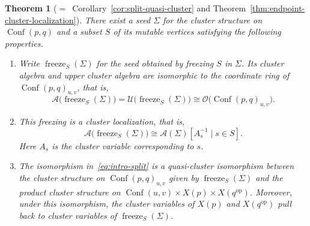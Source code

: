 \documentclass[10pt,a4paper]{article}
\newtheorem{theorem}{Theorem}[section]
\theoremstyle{definition}
\theoremstyle{remark}
\newcommand{\Conf}{\operatorname{Conf}}
\begin{document}
\begin{theorem}[\(=\)~Corollary~\ref{cor:split-quasi-cluster} and Theorem~\ref{thm:endpoint-cluster-localization}]
\label{thm:main}
There exist a seed \(\Sigma\) for the cluster structure on \(\Conf(p,q)\) and a subset \(S\) of its
mutable vertices satisfying the following properties.
\begin{enumerate}[label=\textup{(\arabic*)}]
  \item Write \(\operatorname{freeze}_S(\Sigma)\) for the seed obtained by
  freezing \(S\) in \(\Sigma\).  Its
  cluster algebra and 
  upper cluster algebra are isomorphic to the coordinate ring of
  \(\Conf(p,q)_{u,v}\), that is,
  \[
  \mathcal A\bigl(\operatorname{freeze}_S(\Sigma)\bigr) = 
  \mathcal U\bigl(\operatorname{freeze}_S(\Sigma)\bigr)
  \cong
  \mathcal O\bigl(\Conf(p,q)_{u,v}\bigr).
  \]
  \item This freezing is a cluster localization, that is,
  \[
  \mathcal A\bigl(\operatorname{freeze}_S(\Sigma)\bigr)
  \cong
  \mathcal A(\Sigma)\left[A_s^{-1}\mid s\in S\right].
  \]
  Here \(A_s\) is the cluster variable corresponding to \(s\).
  \item
  The isomorphism in~\eqref{eq:intro-split} is a quasi-cluster
  isomorphism between the cluster structure on \(\Conf(p,q)_{u,v}\) given by
  \(\operatorname{freeze}_S(\Sigma)\) and 
  the product cluster structure on \(\Conf(u,v)\times X(p)\times X(q^{\mathrm{op}})\).
  Moreover, under this isomorphism, the cluster variables of
  \(X(p)\) and \(X(q^{\mathrm{op}})\) pull back to cluster variables of
  \(\operatorname{freeze}_S(\Sigma)\).
\end{enumerate}
\end{theorem}
\end{document}

